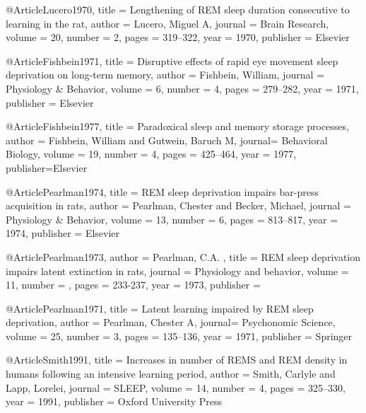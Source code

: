 

@Article{Lucero1970,
  title   = {{Lengthening of REM sleep duration consecutive to learning in the rat}},
  author  = {Lucero, Miguel A},
  journal = {{Brain Research}},
  volume  = {20},
  number  = {2},
  pages   = {319--322},
  year    = {1970},
  publisher = {Elsevier}
}

@Article{Fishbein1971,
  title   = {Disruptive effects of rapid eye movement sleep deprivation on long-term memory},
  author  = {Fishbein, William},
  journal = {{Physiology \& Behavior}},
  volume  = {6},
  number  = {4},
  pages   = {279--282},
  year    = {1971},
  publisher = {Elsevier}
}

@Article{Fishbein1977,
  title  = {Paradoxical sleep and memory storage processes},
  author = {Fishbein, William and 
            Gutwein, Baruch M},
  journal= {{Behavioral Biology}},
  volume = {19},
  number = {4},
  pages  = {425--464},
  year   = {1977},
  publisher={Elsevier}
}

@Article{Pearlman1974,
  title   = {{REM sleep deprivation impairs bar-press acquisition in rats}},
  author  = {Pearlman, Chester 
             and Becker, Michael},
  journal = {{Physiology \& Behavior}},
  volume  = {13},
  number  = {6},
  pages   = {813--817},
  year    = {1974},
  publisher = {Elsevier}
}

@Article{Pearlman1973,
  author  = {Pearlman, C.A. },
  title   = {REM sleep deprivation impairs latent extinction in rats},
  journal = {Physiology and behavior},
  volume  = {11},
  number  = {},
  pages   = {233-237},
  year    = {1973},
  publisher = {}
}

@Article{Pearlman1971,
  title  = {{Latent learning impaired by REM sleep deprivation}},
  author = {Pearlman, Chester A},
  journal= {{Psychonomic Science}},
  volume = {25},
  number = {3},
  pages  = {135--136},
  year   = {1971},
  publisher = {Springer}
}

@Article{Smith1991,
  title   = {{Increases in number of REMS and REM density in humans following an intensive 
              learning period}},
  author  = {Smith, Carlyle 
             and Lapp, Lorelei},
  journal = {SLEEP},
  volume  = {14},
  number  = {4},
  pages   = {325--330},
  year    = {1991},
  publisher = {Oxford University Press}
}




